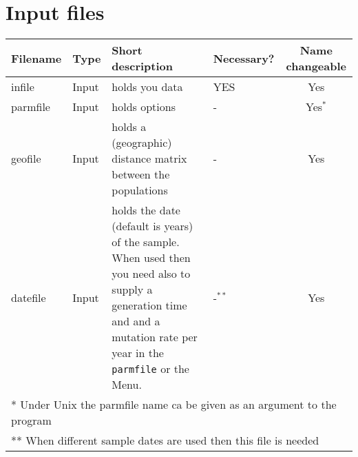 \section{Input files}
\begin{center}
\begin{tabular}{l l p{7.0cm} l c}
\hline
Filename & Type & Short description & Necessary?  & Name changeable\\
\hline
infile & Input           & {holds you data} & YES & Yes\\
parmfile  & Input       & {holds options} & - & Yes$^{*}$\\
geofile & Input & {holds a (geographic) distance matrix between the populations} & - & Yes\\
\hline
datefile & Input & holds the date (default is years) of the sample. When used then you need also to supply a generation time and and a mutation rate per year in the \texttt{parmfile} or the Menu. & -$^{**}$ & Yes\\
\hline
\hline
\multicolumn{5}{l}{* Under Unix the parmfile name ca be given as an argument to the program}\\
\multicolumn{5}{l}{** When different sample dates are used then this file is needed}
\end{tabular}
\end{center}
